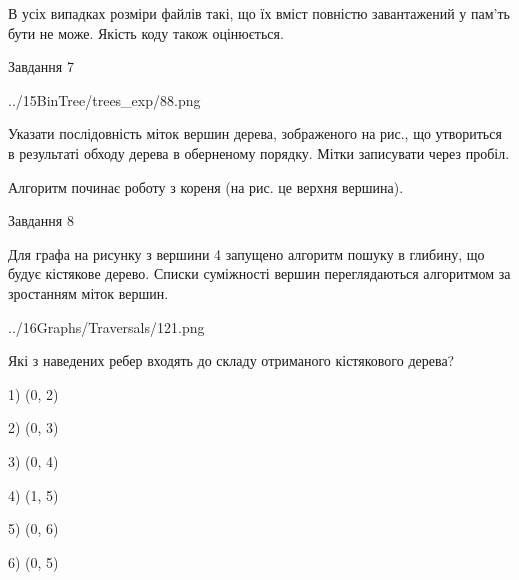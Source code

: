 \documentclass[12pt, ukrainian]{article}
\begin{document}
{В усіх випадках розміри файлів такі, що їх вміст повністю завантажений у пам'ть бути не може. Якість коду також оцінюється.



\vspace{10mm}\par

\newpage
\begin{minipage}[t]{9.7cm}
               
{\begin{center}Завдання {7}\end{center}}
\vspace{-4mm}

\begin{center}
	{../15BinTree/trees_exp/88.png}
\end{center}
Указати послідовність міток вершин дерева, зображеного на рис., що утвориться в результаті обходу дерева в оберненому порядку. Мітки записувати через пробіл.\par Алгоритм починає роботу з кореня (на рис. це верхня вершина).\par

\end{minipage}
\vline \hspace{8mm}
\begin{minipage}[t]{8.0cm}
               
{\begin{center}Завдання {8}\end{center}}
\vspace{-4mm}
Для графа на рисунку з вершини 4 запущено алгоритм пошуку в глибину, що будує кістякове дерево. Списки суміжності вершин переглядаються алгоритмом за зростанням міток вершин.\par
\begin{center}
	{../16Graphs/Traversals/121.png}
\end{center}
\par Які з наведених ребер входять до складу отриманого кістякового дерева?\par
1) (0, 2)\par
2) (0, 3)\par
3) (0, 4)\par
4) (1, 5)\par
5) (0, 6)\par
6) (0, 5)\par
{\vskip 15pt} \par


\end{minipage}}
\end{document}
